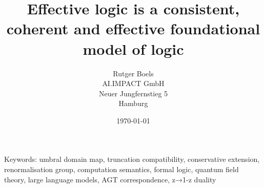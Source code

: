 \documentclass[11pt,a4paper]{article}
\title{Effective logic is a consistent, coherent and effective foundational model of logic}
\author{Rutger Boels\\AI.IMPACT GmbH\\Neuer Jungfernstieg 5\\Hamburg}
\date{\today}
\theoremstyle{definition}
\begin{document}
\maketitle



Keywords: umbral domain map, truncation compatibility, conservative extension, renormalisation group, computation semantics, formal logic, quantum field theory, large language models, AGT correspondence, z→1-z duality

\tableofcontents
\newpage
















\end{document}
